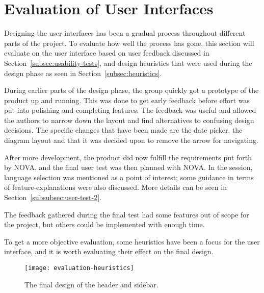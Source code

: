 \section{Evaluation of User Interfaces}\label{sec:evaluation}

Designing the user interfaces has been a gradual process throughout different
parts of the project.
To evaluate how well the process has gone, this section will evaluate on the
user interface based on user feedback discussed in Section~\ref{subsec:usability-tests},
and design heuristics that were used during the design phase as seen in Section~\ref{subsec:heuristics}.

During earlier parts of the design phase, the group quickly got a prototype of
the product up and running.
This was done to get early feedback before effort was put into polishing and completing features.
The feedback was useful and allowed the authors to narrow down the layout
and find alternatives to confusing design decisions.
The specific changes that have been made are the date picker, the diagram layout and that it was decided upon to remove
the arrow for navigating.

After more development, the product did now fulfill the requirements put forth
by NOVA, and the final user test was then planned with NOVA\@.
In the session, language selection was mentioned as a point of interest; some
guidance in terms of feature-explanations were also discussed.
More details can be seen in Section~\ref{subsubsec:user-test-2}.

The feedback gathered during the final test had some features out of
scope for the project, but others could be implemented with enough time.

To get a more objective evaluation, some heuristics have been a focus for
the user interface, and it is worth evaluating their effect on the final design.

\begin{figure}
    \centering
    \texttt{[image: evaluation-heuristics]}
    \caption{The final design of the header and sidebar.
    }\label{fig:evaluation-heuristics}
\end{figure}

